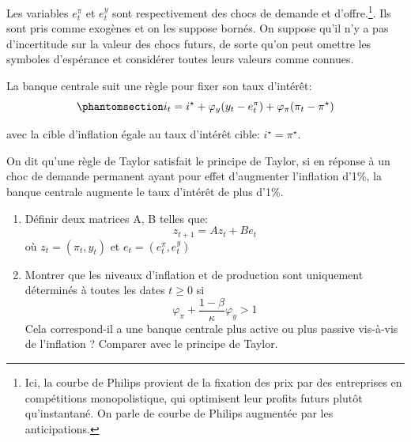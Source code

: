 \documentclass{article}
\begin{document}
Les variables \(e^{\pi}_t\) et \(e^{y}_t\) sont respectivement des chocs
de demande et d'offre.\footnote{Ici, la courbe de Philips provient de la
  fixation des prix par des entreprises en compétitions monopolistique,
  qui optimisent leur profits futurs plutôt qu'instantané. On parle de
  courbe de Philips augmentée par les anticipations.}. Ils sont pris
comme exogènes et on les suppose bornés. On suppose qu'il n'y a pas
d'incertitude sur la valeur des chocs futurs, de sorte qu'on peut
omettre les symboles d'espérance et considérer toutes leurs valeurs
comme connues.

La banque centrale suit une règle pour fixer son taux d'intérêt:
\begin{equation}\phantomsection\label{eq-taylor}{i_t = i^{\star} + \varphi_y (y_t - e^{\pi}_t) + \varphi_\pi (\pi_t - \pi^{\star})}\end{equation}

avec la cible d'inflation égale au taux d'intérêt cible:
\(i^{\star}=\pi^{\star}\).

On dit qu'une règle de Taylor satisfait le principe de Taylor, si en
réponse à un choc de demande permanent ayant pour effet d'augmenter
l'inflation d'1\%, la banque centrale augmente le taux d'intérêt de plus
d'1\%.

\begin{enumerate}

\item  Définir deux matrices A, B telles que: \[z_{t+1} = A z_t + B e_t\] où \(z_t=(\pi_t, y_t)\) et \(e_t = (e^{\pi}_t, e^{y}_t)\)
\item   Montrer que les niveaux d'inflation et de production sont uniquement déterminés à toutes les dates \(t\geq 0\) si \[\varphi_{\pi} + \frac{1-\beta}{\kappa} \varphi_{y}> 1\] Cela   correspond-il a une banque centrale plus active ou plus passive   vis-à-vis de l'inflation ? Comparer avec le principe de Taylor.
\end{enumerate}
\end{document}
